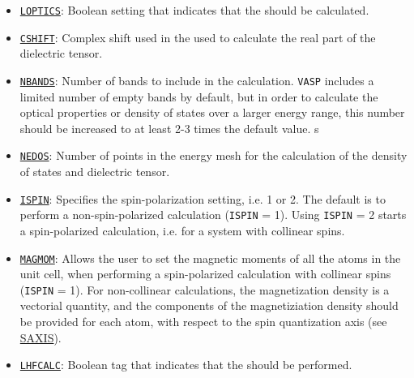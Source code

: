 \begin{refsection}
\begin{itemize}
 \label{appendix:sec-LOPTICS} 
\item \href{https://cms.mpi.univie.ac.at/wiki/index.php/LOPTICS}{\texttt{LOPTICS}}: 
Boolean setting that indicates that the 
 should be 
calculated.

 \label{appendix:sec-CSHIFT} 
\item \href{https://cms.mpi.univie.ac.at/wiki/index.php/CSHIFT}{\texttt{CSHIFT}}: 
Complex shift used in the  used 
to calculate the real part of the dielectric tensor.

 \label{appendix:sec-NBANDS} 
\item \href{https://cms.mpi.univie.ac.at/wiki/index.php/NBANDS}{\texttt{NBANDS}}: 
Number of bands to include in the calculation. \texttt{VASP} includes a limited 
number of empty bands by default, but in order to calculate the optical properties 
or density of states over a larger energy range, this number should be increased 
to at least 2-3 times the default value.
s
 \label{appendix:sec-NEDOS} 
\item \href{https://cms.mpi.univie.ac.at/wiki/index.php/NEDOS}{\texttt{NEDOS}}: 
Number of points in the energy mesh for the calculation of the density of states 
and dielectric tensor.
 
 \label{appendix:sec-ISPIN} 
\item \href{https://cms.mpi.univie.ac.at/wiki/index.php/ISPIN}{\texttt{ISPIN}}: 
Specifies the spin-polarization setting, i.e. 1 or 2. The default is to perform 
a non-spin-polarized calculation (\texttt{ISPIN} = 1). Using \texttt{ISPIN} = 2 
starts a spin-polarized calculation, i.e. for a system with collinear spins.
 
 \label{appendix:sec-MAGMOM} 
\item \href{https://cms.mpi.univie.ac.at/wiki/index.php/MAGMOM}{\texttt{MAGMOM}}: 
Allows the user to set the magnetic moments of all the atoms in the unit cell, 
when performing a spin-polarized calculation with collinear spins (\texttt{ISPIN} = 1).
For non-collinear calculations, the magnetization density is a vectorial quantity, 
and the components of the magnetiziation density should be provided for each atom, 
with respect to the spin quantization axis (see 
\href{https://cms.mpi.univie.ac.at/wiki/index.php/SAXIS}{SAXIS}).

 \label{appendix:sec-LHFCALC} 
\item \href{https://cms.mpi.univie.ac.at/wiki/index.php/LHFCALC}{\texttt{LHFCALC}}: 
Boolean tag that indicates that the  should be performed. 


\end{itemize}
\end{refsection}
